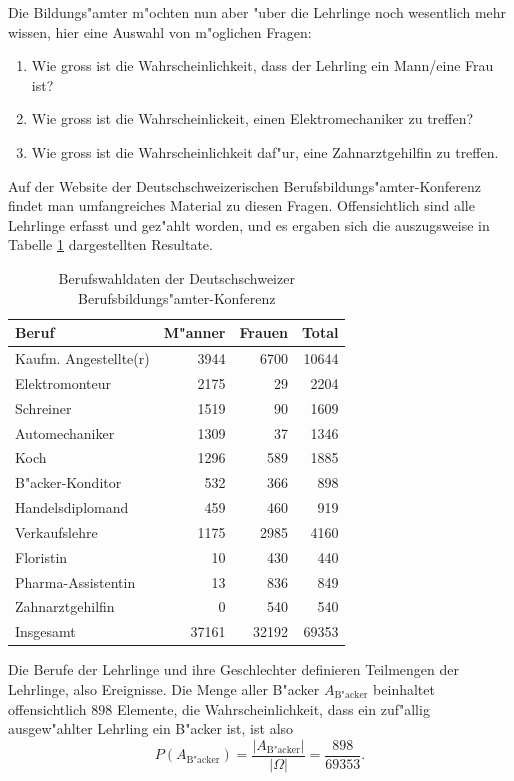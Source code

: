 Die Bildungs"amter m"ochten nun aber "uber die Lehrlinge noch wesentlich mehr
wissen, hier eine Auswahl von m"oglichen Fragen:
\begin{enumerate}
\item Wie gross ist die Wahrscheinlichkeit, dass der Lehrling ein Mann/eine
Frau ist?
\item Wie gross ist die Wahrscheinlickeit, einen Elektromechaniker zu treffen?
\item Wie gross ist die Wahrscheinlichkeit daf"ur, eine Zahnarztgehilfin
zu treffen.
\end{enumerate}
Auf der Website der Deutschschweizerischen Berufsbildungs"amter-Konferenz
findet man umfangreiches Material zu diesen Fragen. Offensichtlich
sind alle Lehrlinge erfasst und gez"ahlt worden, und es ergaben sich
die auszugsweise in Tabelle \ref{berufswahldaten} dargestellten
Resultate.
\begin{table}
\begin{center}
\begin{tabular}{|l|r|r|r|}
\hline
Beruf&M"anner&Frauen&Total\\
\hline
Kaufm. Angestellte(r)&3944&6700&10644\\
Elektromonteur&2175&29&2204\\
Schreiner&1519&90&1609\\
Automechaniker&1309&37&1346\\
Koch&1296&589&1885\\
B"acker-Konditor&532&366&898\\
Handelsdiplomand&459&460&919\\
Verkaufslehre&1175&2985&4160\\
Floristin&10&430&440\\
Pharma-Assistentin&13&836&849\\
Zahnarztgehilfin&0&540&540\\
\hline
Insgesamt&37161&32192&69353\\
\hline
\end{tabular}
\end{center}
\caption{Berufswahldaten der Deutschschweizer Berufsbildungs"amter-Konferenz\label{berufswahldaten}}
\end{table}
Die Berufe der Lehrlinge und ihre Geschlechter definieren Teilmengen
der Lehrlinge, also Ereignisse. Die Menge aller B"acker $A_{\text{B"acker}}$
beinhaltet offensichtlich $898$ Elemente, die Wahrscheinlichkeit, dass ein
zuf"allig ausgew"ahlter Lehrling ein B"acker ist, ist also
\[
P(A_{\text{B"acker}})=\frac{|A_{\text{B"acker}}|}{|\Omega|}
=\frac{898}{69353}.
\]
